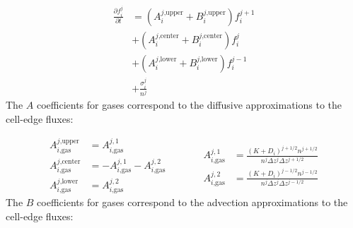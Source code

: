 \begin{equation} \label{eq:dfdt_general}
\begin{split} 
  \frac{\partial f_{i}^j}{\partial t} &= (A_{i}^{j\text{,upper}}+ B_{i}^{j\text{,upper}}) f_{i}^{j+1} \\
  &+ (A_{i}^{j\text{,center}} + B_{i}^{j\text{,center}}) f_{i}^{j} \\
  &+ (A_{i}^{j\text{,lower}} + B_{i}^{j\text{,lower}}) f_{i}^{j-1} \\
  &+ \frac{\sigma_i^j}{n^{j}}
\end{split}
\end{equation}
The $A$ coefficients for gases correspond to the diffusive approximations to the cell-edge fluxes:

\begin{equation*}
\begin{aligned}
  A_{i\text{,gas}}^{j\text{,upper}} &= A_{i\text{,gas}}^{j,1} \\
  A_{i\text{,gas}}^{j\text{,center}} &= - A_{i\text{,gas}}^{j,1} - A_{i\text{,gas}}^{j,2} \\
  A_{i\text{,gas}}^{j\text{,lower}} &= A_{i\text{,gas}}^{j,2}
\end{aligned}
\quad\quad\quad
\begin{aligned}
  A_{i\text{,gas}}^{j,1} &= \frac{(K + D_{i})^{j+1/2} n^{j+1/2}}{n^j \Delta z^j \Delta z^{j+1/2}} \\
  A_{i\text{,gas}}^{j,2} &= \frac{(K + D_{i})^{j-1/2} n^{j-1/2}}{n^j \Delta z^j \Delta z^{j-1/2}} 
\end{aligned}
\end{equation*}
The $B$ coefficients for gases correspond to the advection approximations to the cell-edge fluxes:

